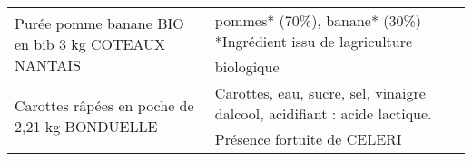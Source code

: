 \begin{longtable}{p{5cm}p{10cm}}
                                                       Purée pomme banane BIO en bib 3 kg COTEAUX NANTAIS &                                                                                                                                                                                                                                                                                                                                                                                                                                                                                                                                                                                                                                                                                                                                                                                                                                                                                                                                                               pommes* (70\%), banane* (30\%)  *Ingrédient issu de lagriculture biologique \\
                                                            Carottes râpées en poche de 2,21 kg BONDUELLE &                                                                                                                                                                                                                                                                                                                                                                                                                                                                                                                                                                                                                                                                                                                                                                                                                                                                                                                                   Carottes, eau, sucre, sel, vinaigre dalcool, acidifiant : acide lactique. Présence fortuite de CELERI \\

\end{longtable}
